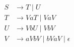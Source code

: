 
\setcounter{equation}{0}
\begin{align}
  S &\to T \mid U \\[8pt]
  T &\to VaT \mid VaV \\[8pt]
  U &\to VbU \mid VbV \\[8pt]
  V &\to aVbV \mid bVaV \mid \epsilon
\end{align}